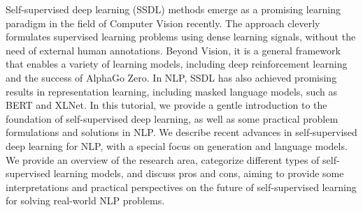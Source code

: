 Self-supervised deep learning (SSDL) methods emerge as a promising learning paradigm in the field of Computer Vision recently. The approach cleverly formulates supervised learning problems using dense learning signals, without the need of external human annotations. Beyond Vision, it is a general framework that enables a variety of learning models, including deep reinforcement learning and the success of AlphaGo Zero. In NLP, SSDL has also achieved promising results in representation learning, including masked language models, such as BERT and XLNet. In this tutorial, we provide a gentle introduction to the foundation of self-supervised deep learning, as well as some practical problem formulations and solutions in NLP. We describe recent advances in self-supervised deep learning for NLP, with a special focus on generation and language models. We provide an overview of the research area, categorize different types of self-supervised learning models, and discuss pros and cons, aiming to provide some interpretations and practical perspectives on the future of self-supervised learning for solving real-world NLP problems.
